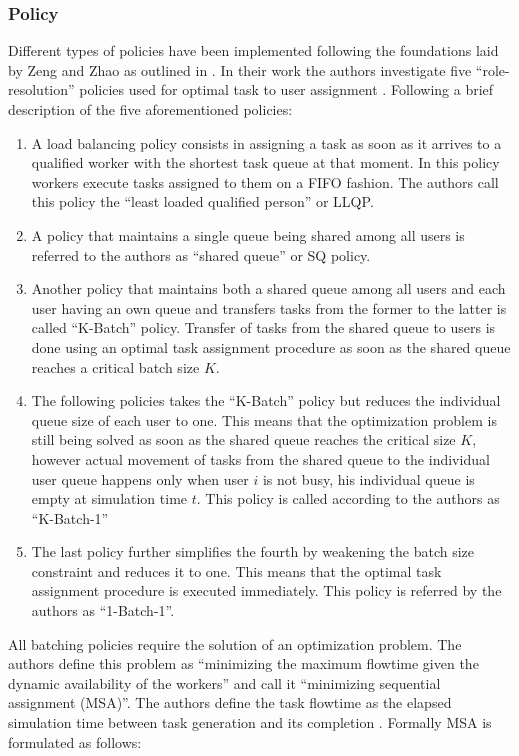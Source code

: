 \documentclass{seal_thesis}
\begin{document}
\subsubsection{Policy}

Different types of policies have been implemented following the foundations laid by Zeng and Zhao as outlined in . In their work the authors investigate five ``role-resolution'' policies used for optimal task to user assignment \cite[p. 7]{Zeng2005}. Following a brief description of the five aforementioned policies:

\begin{enumerate}
	\item A load balancing policy consists in assigning a task as soon as it arrives to a qualified worker with the shortest task queue at that moment. In this policy workers execute tasks assigned to them on a FIFO fashion. The authors call this policy the ``least loaded qualified person'' or LLQP.
	\item A policy that maintains a single queue being shared among all users is referred to the authors as ``shared queue'' or SQ policy.
	\item Another policy that maintains both a shared queue among all users and each user having an own queue and transfers tasks from the former to the latter is called ``K-Batch'' policy. Transfer of tasks from the shared queue to users is done using an optimal task assignment procedure as soon as the shared queue reaches a critical batch size $K$.
	\item The following policies takes the ``K-Batch'' policy but reduces the individual queue size of each user to one. This means that the optimization problem is still being solved as soon as the shared queue reaches the critical size $K$, however actual movement of tasks from the shared queue to the individual user queue happens only when user $i$ is not busy, \ie his individual queue is empty at simulation time $t$. This policy is called according to the authors as ``K-Batch-1''
	\item The last policy further simplifies the fourth by weakening the batch size constraint and reduces it to one. This means that the optimal task assignment procedure is executed immediately. This policy is referred by the authors as ``1-Batch-1''.
\end{enumerate}

All batching policies require the solution of an optimization problem. The authors define this problem as ``minimizing the maximum flowtime given the dynamic availability of the workers'' and call it ``minimizing sequential assignment (MSA)''\cite[p. 7]{Zeng2005}. The authors define the task flowtime as the elapsed simulation time between task generation and its completion \cite{Zeng2005,Baker1974}. Formally MSA is formulated as follows:
\end{document}
